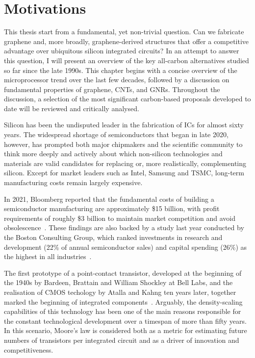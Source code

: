 \chapter{Motivations}

\minitoc

This thesis start from a fundamental, yet non-trivial question. Can we fabricate graphene and, more broadly, graphene-derived structures that offer a competitive advantage over ubiquitous silicon integrated circuits? In an attempt to answer this question, I will present an overview of the key all-carbon alternatives studied so far since the late 1990s. This chapter begins with a concise overview of the microprocessor trend over the last few decades, followed by a discussion on fundamental properties of graphene, \glspl{CNT}, and \glspl{GNR}. Throughout the discussion, a selection of the most significant carbon-based proposals developed to date will be reviewed and critically analysed.

Silicon has been the undisputed leader in the fabrication of \glspl{IC} for almost sixty years. The widespread shortage of semiconductors that began in late 2020, however, has prompted both major chipmakers and the scientific community to think more deeply and actively about which non-silicon technologies and materials are valid candidates for replacing or, more realistically, complementing silicon. Except for market leaders such as Intel, Samsung and TSMC, long-term manufacturing costs remain largely expensive.

In 2021, Bloomberg reported that the fundamental costs of building a semiconductor manufacturing are approximately \$15 billion, with profit requirements of roughly \$3 billion to maintain market competition and avoid obsolescence~\cite{king2021}. These findings are also backed by a study last year conducted by the Boston Consulting Group, which ranked investments in research and development (22\% of annual semiconductor sales) and capital spending (26\%) as the highest in all industries~\cite{veras2021}.

The first prototype of a point-contact transistor, developed at the beginning of the 1940s by Bardeen, Brattain and William Shockley at Bell Labs, and the realisation of \gls{CMOS} techology by Atalla and Kahng ten years later, together marked the beginning of integrated components~\cite{shockley1984path}. Arguably, the density-scaling capabilities of this technology has been one of the main reasons responsible for the constant technological development over a timespan of more than fifty years. In this scenario, Moore's law is considered both as a metric for estimating future numbers of transistors per integrated circuit and as a driver of innovation and competitiveness.

